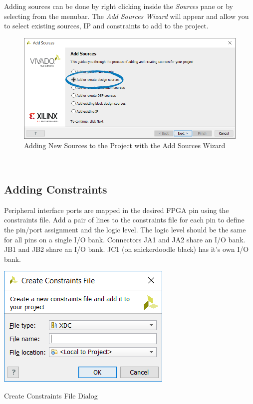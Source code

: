 Adding sources can be done by right clicking inside the \textit{Sources} pane or by selecting  from the menubar. The \textit{Add Sources Wizard} will appear and allow you to select existing sources, IP and constraints to add to the project.


\begin{figure}
	\centering
	\includegraphics{images/vivado/add_sources.png}
	\caption{Adding New Sources to the Project with the Add Sources Wizard}
	\label{fig:addsourceswiz}
\end{figure}

~\\



\subsection{Adding Constraints}
Peripheral interface ports are mapped in the desired FPGA pin using the constraints file. Add a pair of lines to the constraints file for each pin to define the pin/port assignment and the logic level. The logic level should be the same for all pins on a single I/O bank. Connectors JA1 and JA2 share an I/O bank. JB1 and JB2 share an I/O bank. JC1 (on snickerdoodle black) has it's own I/O bank. \\

\begin{marginfigure}
	\centering
	\includegraphics{images/vivado/create_constraints_file.png}
	\caption[Create Constraints File Dialog]{Create Constraints File Dialog}
	\label{fig:createconstraintsfile}
\end{marginfigure}


